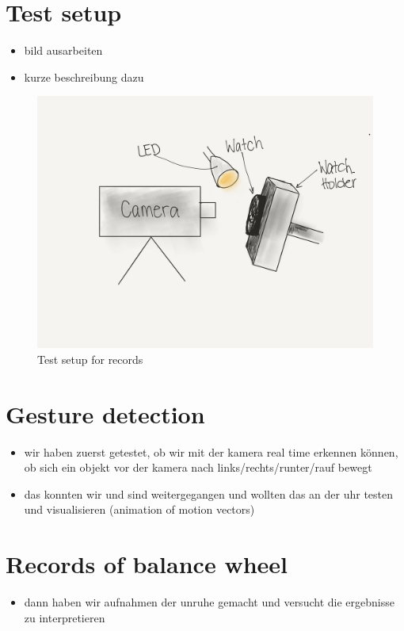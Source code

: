 \documentclass[12pt, a4paper]{report}
\begin{document}
   \section{Test setup}
    \begin{itemize}
        \item bild ausarbeiten
        \item kurze beschreibung dazu
      \end{itemize}
      \begin{figure}[H]
        \centering
        \includegraphics[scale=0.1]{Images/test_setup}
        
        \caption{Test setup for records}
        \end{figure}
    \section{Gesture detection}
    \begin{itemize}
        \item wir haben zuerst getestet, ob wir mit der kamera real time erkennen können, ob sich ein objekt vor der kamera nach links/rechts/runter/rauf bewegt
        \item das konnten wir und sind weitergegangen und wollten das an der uhr testen und visualisieren (animation of motion vectors) 
      \end{itemize}
    \section{Records of balance wheel}
    \begin{itemize}
        \item dann haben wir aufnahmen der unruhe gemacht und versucht die ergebnisse zu interpretieren
    \end{itemize}
    
\end{document}
